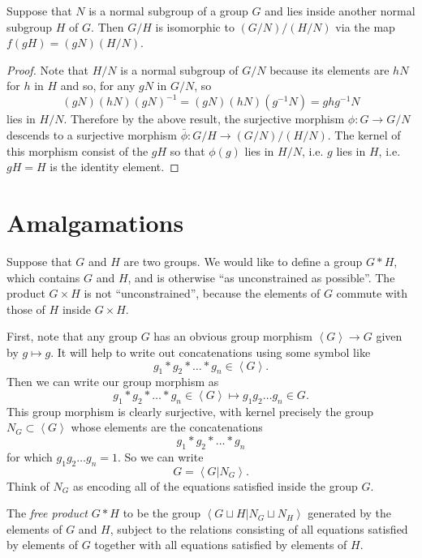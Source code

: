 \begin{theorem}
Suppose that \(N\) is a normal subgroup of a group \(G\) and lies inside another normal subgroup \(H\) of \(G\).
Then \(G/H\) is isomorphic to \((G/N)/(H/N)\) via the map \(f(gH)=(gN)(H/N)\).
\end{theorem}
\begin{proof}
Note that \(H/N\) is a  normal subgroup of \(G/N\) because its elements are \(hN\) for \(h\) in \(H\) and so, for any \(gN\) in \(G/N\), so
\[
(gN)(hN)(gN)^{-1}=(gN)(hN)(g^{-1}N)=ghg^{-1}N
\]
lies in \(H/N\).
Therefore by the above result, the surjective morphism \(\phi \colon G \to G/N\) descends to a surjective morphism \(\bar\phi \colon G/H \to (G/N)/(H/N)\). 
The kernel of this morphism consist of the \(gH\) so that \(\phi(g)\) lies in \(H/N\), i.e. \(g\) lies in \(H\), i.e. \(gH=H\) is the identity element.
\end{proof}


\section{Amalgamations}

Suppose that \(G\) and \(H\) are two groups.
We would like to define a group \(G*H\), which contains \(G\) and \(H\), and is otherwise ``as unconstrained as possible''.
The product \(G \times H\) is not ``unconstrained'', because the elements of \(G\) commute with those of \(H\) inside \(G \times H\).

First, note that any group \(G\) has an obvious group morphism \(\left<G\right> \to G\) given by \(g \mapsto g\).
It will help to write out concatenations using some symbol like
\[
g_1 * g_2 * \dots * g_n \in \left<G\right>.
\]
Then we can write our group morphism as
\[
g_1 * g_2 * \dots * g_n \in \left<G\right> \mapsto g_1 g_2 \dots g_n \in G.
\]
This group morphism is clearly surjective, with kernel precisely the group \(N_G \subset \left<G\right>\) whose elements are the concatenations
\[
g_1 * g_2 * \dots * g_n
\]
for which \(g_1 g_2 \dots g_n=1\).
So we can write
\[
G=\left<G|N_G\right>.
\]
Think of \(N_G\) as encoding all of the equations satisfied inside the group \(G\).

The \emph{free product} \(G*H\) to be the group \(\left<G \sqcup H|N_G \sqcup N_H\right>\) generated by the elements of \(G\) and \(H\), subject to the relations consisting of all equations satisfied by elements of \(G\) together with all equations satisfied by elements of \(H\).

